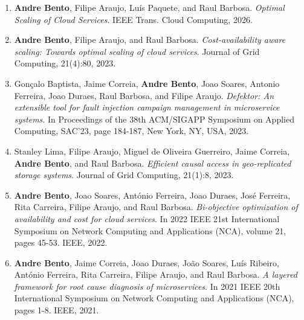 \documentclass[a4paper,9pt]{memoir}
\newcommand{\td}[1]{\textcolor{red}{#1}}
\begin{document}
\begin{enumerate}[leftmargin=*]
	\item \textbf{Andre Bento}, Filipe Araujo, Luís Paquete, and Raul Barbosa. \emph{Optimal Scaling of Cloud Services}. IEEE Trans. Cloud Computing, 2026.
	\item \textbf{Andre Bento}, Filipe Araujo, and Raul Barbosa. \emph{Cost-availability aware scaling: Towards optimal scaling of cloud services}. Journal of Grid Computing, 21(4):80, 2023.%
	\item Gonçalo Baptista, Jaime Correia, \textbf{Andre Bento}, Joao Soares, Antonio Ferreira, Joao Duraes, Raul Barbosa, and Filipe Araujo. \emph{Defektor: An extensible tool for fault injection campaign management in microservice systems}. In Proceedings of the 38th ACM/SIGAPP Symposium on Applied Computing, SAC'23, page 184-187, New York, NY, USA, 2023.%
	\item Stanley Lima, Filipe Araujo, Miguel de Oliveira Guerreiro, Jaime Correia, \textbf{Andre Bento}, and Raul Barbosa. \emph{Efficient causal access in geo-replicated storage systems}. Journal of Grid Computing, 21(1):8, 2023.%
	\item \textbf{Andre Bento}, Joao Soares, António Ferreira, Joao Duraes, José Ferreira, Rita Carreira, Filipe Araujo, and Raul Barbosa. \emph{Bi-objective optimization of availability and cost for cloud services}. In 2022 IEEE 21st International Symposium on Network Computing and Applications (NCA), volume 21, pages 45-53. IEEE, 2022.%
	\item \textbf{Andre Bento}, Jaime Correia, Joao Duraes, João Soares, Luís Ribeiro, António Ferreira, Rita Carreira, Filipe Araujo, and Raul Barbosa. \emph{A layered framework for root cause diagnosis of microservices}. In 2021 IEEE 20th International Symposium on Network Computing and Applications (NCA), pages 1-8. IEEE, 2021.%

\end{enumerate}
\end{document}
